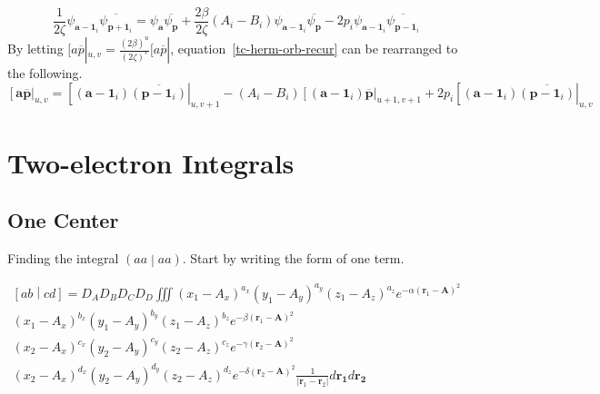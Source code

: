 \documentclass{article}
\begin{document}
\begin{equation}
  \frac{1}{2\zeta}\psi_{\mathbf{a} - \mathbf{1}_i}\overline{\psi_{\mathbf{p} + \mathbf{1}_i}} = \psi_{\mathbf{a}}\overline{\psi_{\mathbf{p}}} + \frac{2\beta}{2\zeta}\left(A_i - B_i\right)\psi_{\mathbf{a} - \mathbf{1}_i}\overline{\psi_{\mathbf{p}}} - 2p_i\psi_{\mathbf{a} - \mathbf{1}_i}\overline{\psi_{\mathbf{p} - \mathbf{1}_i}}
  \label{tc-herm-orb-recur}
\end{equation}
By letting $[a\overline{p}|_{u,v} = \frac{(2\beta)^u}{(2\zeta)^v}[a\overline{p}|$, equation~\ref{tc-herm-orb-recur} can be rearranged to the following.
\begin{equation}
  \left[\mathbf{a}\overline{\mathbf{p}}\right|_{u,v} = \left[\left(\mathbf{a} - \mathbf{1}_i\right)\overline{\left(\mathbf{p} - \mathbf{1}_i\right)}\right|_{u,v+1} - \left(A_i - B_i\right)\left[\left(\mathbf{a} - \mathbf{1}_i\right)\overline{\mathbf{p}}\right|_{u+1,v+1} + 2p_i\left[\left(\mathbf{a} - \mathbf{1}_i\right)\overline{\left(\mathbf{p} - \mathbf{1}_i\right)}\right|_{u,v}
  \label{tc-recur}
\end{equation}



\section{Two-electron Integrals}
\subsection{One Center}
Finding the integral $\left(aa\middle|aa\right)$. Start by writing the form of one term.

\begin{multline}
  \left[ab\middle|cd\right] = D_A D_B D_C D_D \iiint\left(x_1 - A_x\right)^{a_x}\left(y_1 - A_y\right)^{a_y} \left(z_1 - A_z\right)^{a_z} e^{-\alpha\left(\mathbf{r}_1 - \mathbf{A}\right)^2} \\
  \left(x_1 - A_x\right)^{b_x}\left(y_1 - A_y\right)^{b_y} \left(z_1 - A_z\right)^{b_z}  e^{-\beta\left(\mathbf{r}_1 - \mathbf{A}\right)^2} \\
  \left(x_2 - A_x\right)^{c_x}\left(y_2 - A_y\right)^{c_y} \left(z_2 - A_z\right)^{c_z} e^{-\gamma\left(\mathbf{r}_2 - \mathbf{A}\right)^2} \\
  \left(x_2 - A_x\right)^{d_x}\left(y_2 - A_y\right)^{d_y} \left(z_2 - A_z\right)^{d_z}  e^{-\delta\left(\mathbf{r}_2 - \mathbf{A}\right)^2} \frac{1}{\left|\mathbf{r}_1 - \mathbf{r}_2\right|} d\mathbf{r_1} d\mathbf{r_2}
  \label{oc-integral}
\end{multline}
\end{document}
